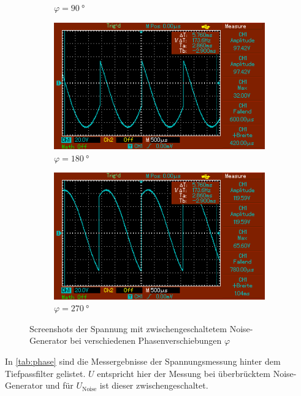 \begin{figure}
\begin{subfigure}{0.3\textwidth}
        \caption{$\varphi = \SI{90}{\degree}$}
        \label{fig:2_90}
    \end{subfigure}
    \par\medskip %
    \begin{subfigure}{0.3\textwidth}
        \centering
        \includegraphics[width=\textwidth]{images/2_180.png}
        \caption{$\varphi = \SI{180}{\degree}$}
        \label{fig:2_180}
    \end{subfigure}
    \begin{subfigure}{0.3\textwidth}
        \centering
        \includegraphics[width=\textwidth]{images/2_270.png}
        \caption{$\varphi = \SI{270}{\degree}$}
        \label{fig:2_270}
    \end{subfigure}
    \caption{Screenshots der Spannung mit zwischengeschaltetem Noise-Generator bei verschiedenen Phasenverschiebungen $\varphi$}
    \label{fig:2}
\end{figure}

In \autoref{tab:phase} sind die Messergebnisse der Spannungsmessung hinter dem Tiefpassfilter gelistet.
$U$ entspricht hier der Messung bei überbrücktem Noise-Generator und für $U_\text{Noise}$ ist dieser zwischengeschaltet.

